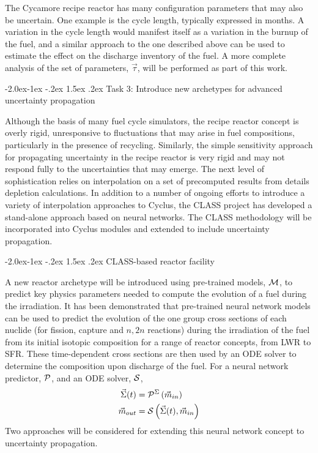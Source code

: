 \documentclass[dvips,11pt]{article}
\makeatletter
\renewcommand\subsection{\@startsection{subsection}{2}{\z@}%
                                     {-2.0ex\@plus -1ex \@minus -.2ex}%
                                     {1.5ex \@plus .2ex}%
                                     {\normalfont\bfseries}}%
\renewcommand\subsubsection{\@startsection{subsubsection}{3}{\z@}%
                                     {-2.0ex\@plus -1ex \@minus -.2ex}%
                                     {1.5ex \@plus .2ex}%
                                     {\normalfont\bfseries}}%
\makeatother
\begin{document}
The Cycamore recipe reactor has many configuration
parameters that may also be uncertain.  One
example is the cycle length, typically expressed
in months.  A variation in the cycle length would
manifest itself as a variation in the burnup of
the fuel, and a similar approach to the one
described above can be used to estimate the effect
on the discharge inventory of the fuel.  A more
complete analysis of the set of parameters,
$\vec{\tau}$, will be performed as part of this work.

\subsection{Task 3: Introduce new archetypes for advanced uncertainty propagation}

Although the basis of many fuel cycle simulators,
the recipe reactor concept is overly rigid,
unresponsive to fluctuations that may arise in fuel
compositions, particularly in the presence of
recycling.  Similarly, the simple sensitivity
approach for propagating uncertainty in the recipe
reactor is very rigid and may not respond fully to
the uncertainties that may emerge.  The next level
of sophistication relies on interpolation on a set
of precomputed results from details depletion
calculations.  In addition to a number of ongoing
efforts to introduce a variety of interpolation
approaches to Cyclus\cite{brightlite, cyborg}, the
CLASS project\cite{CLASS} has developed a
stand-alone approach based on neural networks\cite{Leniau.ANE.2015}. The
CLASS methodology will be incorporated into Cyclus
modules and extended to include uncertainty
propagation.

\subsubsection{CLASS-based reactor facility} \label{sec:reactors}

A new reactor archetype will be introduced using
pre-trained models, ${\cal M}$, to predict key
physics parameters needed to compute the evolution
of a fuel during the irradiation. It has been
demonstrated that pre-trained neural network
models can be used to predict the evolution of the
one group cross sections of each nuclide (for
fission, capture and $n,2n$ reactions) during the
irradiation of the fuel from its initial isotopic
composition for a range of reactor concepts, from
LWR to SFR\cite{Leniau.ANE.2015, Leniau.PHYSOR.2016}.
These time-dependent cross sections are then used
by an ODE solver to determine the composition upon
discharge of the fuel.  For a neural network
predictor, ${\cal P}$, and an ODE solver, ${\cal S}$,
\begin{align}
  \vec{\Sigma}(t) &= {\cal P}^{\Sigma}\left( \vec{m}_{in}\right)\\
  \vec{m}_{out} &= {\cal S}\left( \vec{\Sigma}(t), \vec{m}_{in}\right)
\end{align}
Two approaches will be considered for extending
this neural network concept to uncertainty
propagation.
\end{document}
